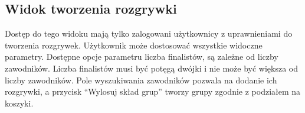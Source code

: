 \documentclass[shortabstract]{iithesis}
\begin{document}
\subsection{Widok tworzenia rozgrywki}
Dostęp do tego widoku mają tylko zalogowani użytkownicy z uprawnieniami do tworzenia rozgrywek.
Użytkownik może dostosować wszystkie widoczne parametry. Dostępne opcje parametru liczba finalistów, są zależne od liczby zawodników.
Liczba finalistów musi być potęgą dwójki i nie może być większa od liczby zawodników.
Pole wyszukiwania zawodników pozwala na dodanie ich rozgrywki, a przycisk ``Wylosuj skład grup'' tworzy grupy zgodnie z podziałem na koszyki.

\begin{figure}[H]
    \centering
    \hfill
\end{figure}
\end{document}
